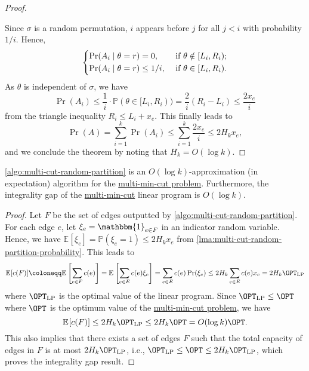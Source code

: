 \begin{proof}
	\begin{center}
	\end{center}

	Since \(\sigma \) is a random permutation, \(i\) appears before \(j\) for all \(j < i\) with probability \(1 / i\). Hence,
	\[
		\begin{dcases}
			\Pr(A_i \mid \theta = r) = 0,        & \text{ if } \theta \notin [L_i, R_i) ; \\
			\Pr(A_i \mid \theta = r) \leq 1 / i, & \text{ if } \theta \in [L_i, R_i).
		\end{dcases}
	\]
	As \(\theta \) is independent of \(\sigma \), we have
	\[
		\Pr(A_i)
		\leq \frac{1}{i} \cdot \mathbb{P} (\theta \in [L_i, R_i))
		= \frac{2}{i} (R_i - L_i)
		\leq \frac{2x_e}{i}
	\]
	from the triangle inequality \(R_i \leq L_i + x_e\). This finally leads to
	\[
		\Pr(A)
		= \sum_{i=1}^{k} \Pr(A_i) \leq \sum_{i=1}^{k} \frac{2x_e}{i}
		\leq 2 H_k x_e,
	\]
	and we conclude the theorem by noting that \(H_k = O(\log k)\).
\end{proof}

\begin{theorem}\label{thm:multi-min-cut-integrality-gap}
	\autoref{algo:multi-cut-random-partition} is an \(O(\log k)\)-approximation (in expectation) algorithm for the \hyperref[prb:multi-min-cut]{multi-min-cut problem}. Furthermore, the integrality gap of the \hyperref[prb:multi-min-cut]{multi-min-cut} linear program is \(O(\log k)\).
\end{theorem}
\begin{proof}
	Let \(F\) be the set of edges outputted by \autoref{algo:multi-cut-random-partition}. For each edge \(e\), let \(\xi _e = \mathbbm{1}_{e \in F}\) in an indicator random variable. Hence, we have \(\mathbb{E}_{}[\xi _e] = \mathbb{P} (\xi _e = 1) \leq 2 H_k x_e\) from \autoref{lma:multi-cut-random-partition-probability}. This leads to
	\[
		\mathbb{E}_{}[c(F)]
		\coloneqq \mathbb{E}_{}\left[ \sum_{e \in F} c(e) \right]
		= \mathbb{E}_{}\left[\sum_{e \in E} c(e) \xi _e\right]
		= \sum_{e \in E} c(e) \Pr(\xi _e)
		\leq 2 H_k \sum_{e \in E} c(e) x_e
		= 2 H_k \OPT_{\mathrm{LP}}
	\]
	where \(\OPT_{\mathrm{LP}}\) is the optimal value of the linear program. Since \(\OPT_{\mathrm{LP}} \leq \OPT\) where \(\OPT\) is the optimum value of the \hyperref[prb:multi-min-cut]{multi-min-cut problem}, we have
	\[
		\mathbb{E}_{}[c(F)]
		\leq 2 H_k \OPT_{\mathrm{LP}}
		\leq 2 H_k \OPT
		= O(\log k) \OPT.
	\]
	This also implies that there exists a set of edges \(F\) such that the total capacity of edges in \(F\) is at most \(2 H_k \OPT_{\mathrm{LP}} \), i.e., \(\OPT_{\mathrm{LP}} \leq \OPT \leq 2 H_k \OPT_{\mathrm{LP}}\), which proves the integrality gap result.
\end{proof}

